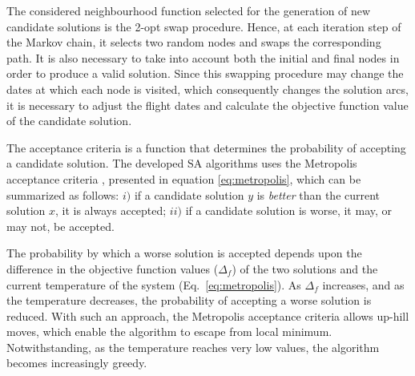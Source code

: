 The considered neighbourhood function selected for the generation of new candidate solutions is the 2-opt swap procedure. Hence, at each iteration step of the Markov chain, it selects two random nodes and swaps the corresponding path. It is also necessary to take into account both the initial and final nodes in order to produce a valid solution. Since this swapping procedure may change the dates at which each node is visited, which consequently changes the solution arcs, it is necessary to adjust the flight dates and calculate the objective function value of the candidate solution.


The acceptance criteria is a function that determines the probability of accepting a candidate solution. The developed SA algorithms uses the Metropolis acceptance criteria \cite{metropolis}, presented in equation \ref{eq:metropolis},  which can be summarized as follows: $i)$ if a candidate solution $y$ is \textit{better} than the current solution $x$, it is always accepted; $ii)$ if a candidate solution is worse, it may, or may not, be accepted. 

The probability by which a worse solution is accepted depends upon the difference in the objective function values ($\Delta_f$) of the two solutions and the current temperature of the system (Eq.~\ref{eq:metropolis}). As $\Delta_f$ increases, and as the temperature decreases, the probability of accepting a worse solution is reduced. With such an approach, the Metropolis acceptance criteria allows up-hill moves, which enable the algorithm to escape from local minimum. Notwithstanding, as the temperature reaches very low values, the algorithm becomes increasingly greedy.

